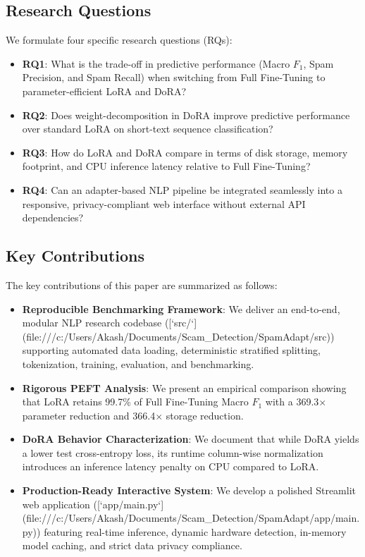 \documentclass[conference]{IEEEtran}
\begin{document}
\subsection{Research Questions}
We formulate four specific research questions (RQs):
\begin{itemize}
    \item \textbf{RQ1}: What is the trade-off in predictive performance (Macro $F_1$, Spam Precision, and Spam Recall) when switching from Full Fine-Tuning to parameter-efficient LoRA and DoRA?
    \item \textbf{RQ2}: Does weight-decomposition in DoRA improve predictive performance over standard LoRA on short-text sequence classification?
    \item \textbf{RQ3}: How do LoRA and DoRA compare in terms of disk storage, memory footprint, and CPU inference latency relative to Full Fine-Tuning?
    \item \textbf{RQ4}: Can an adapter-based NLP pipeline be integrated seamlessly into a responsive, privacy-compliant web interface without external API dependencies?
\end{itemize}

\subsection{Key Contributions}
The key contributions of this paper are summarized as follows:
\begin{itemize}
    \item \textbf{Reproducible Benchmarking Framework}: We deliver an end-to-end, modular NLP research codebase ([`src/`](file:///c:/Users/Akash/Documents/Scam_Detection/SpamAdapt/src)) supporting automated data loading, deterministic stratified splitting, tokenization, training, evaluation, and benchmarking.
    \item \textbf{Rigorous PEFT Analysis}: We present an empirical comparison showing that LoRA retains 99.7\% of Full Fine-Tuning Macro $F_1$ with a 369.3$\times$ parameter reduction and 366.4$\times$ storage reduction.
    \item \textbf{DoRA Behavior Characterization}: We document that while DoRA yields a lower test cross-entropy loss, its runtime column-wise normalization introduces an inference latency penalty on CPU compared to LoRA.
    \item \textbf{Production-Ready Interactive System}: We develop a polished Streamlit web application ([`app/main.py`](file:///c:/Users/Akash/Documents/Scam_Detection/SpamAdapt/app/main.py)) featuring real-time inference, dynamic hardware detection, in-memory model caching, and strict data privacy compliance.
\end{itemize}
\end{document}
